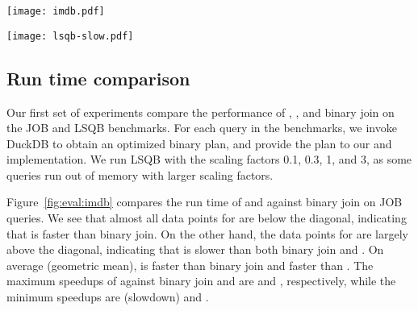 \begin{figure*}
  \centering
  \begin{minipage}[t]{.45\textwidth}
    \centering
    \texttt{[image: imdb.pdf]}
    \label{fig:eval:imdb}
  \end{minipage}%
  \hspace{1em}
  \begin{minipage}[t]{.45\textwidth}
    \centering
    \texttt{[image: lsqb-slow.pdf]}
    \label{fig:eval:lsqb}
  \end{minipage}
\end{figure*}


\subsection{Run time comparison}\label{sec:run-time-comparison}
Our first set of experiments compare the performance of \FJ, \GJ, and binary join
on the JOB and LSQB benchmarks.
For each query in the benchmarks, we invoke DuckDB to obtain an optimized binary plan,
and provide the plan to our \FJ and \GJ implementation.
We run LSQB with the scaling factors 0.1, 0.3, 1, and 3,
as some queries run out of memory with larger scaling factors.

Figure~\ref{fig:eval:imdb} compares the run time of \FJ and \GJ against binary join on JOB queries.
We see that almost all data points for \FJ are below the diagonal,
indicating that \FJ is faster than binary join.
On the other hand, the data points for \GJ are largely above the diagonal,
indicating that \GJ is slower than both binary join and \FJ.
On average (geometric mean), \FJ is \imdbavgfjbj faster than binary join
and \imdbavgfjgj faster than \GJ.
The maximum speedups of \FJ against binary join and \GJ
are \imdbmaxfjbj and \imdbmaxfjgj, respectively,
while the minimum speedups are \imdbminfjbj (\imdbmaxbjfj slowdown) and \imdbminfjgj.

